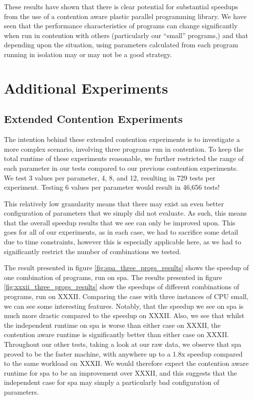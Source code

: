 These results have shown that there is clear potential for substantial speedups from the use of a contention aware plastic parallel programming library. We have seen that the performance characteristics of programs can change significantly when run in contention with others (particularly our ``small'' programs,) and that depending upon the situation, using parameters calculated from each program running in isolation may or may not be a good strategy.



\section{Additional Experiments}
\label{section:results:additional_experiments}

\subsection{Extended Contention Experiments}
\label{section:results:extended_contention_experiments}

The intention behind these extended contention experiments is to investigate a more complex scenario, involving three programs run in contention. To keep the total runtime of these experiments reasonable, we further restricted the range of each parameter in our tests compared to our previous contention experiments. We test 3 values per parameter, 4, 8, and 12, resulting in 729 tests per experiment. Testing 6 values per parameter would result in 46,656 tests!

This relatively low granularity means that there may exist an even better configuration of parameters that we simply did not evaluate. As such, this means that the overall speedup results that we see can only be improved upon. This goes for all of our experiments, as in each case, we had to sacrifice some detail due to time constraints, however this is especially applicable here, as we had to significantly restrict the number of combinations we tested.

The result presented in figure \ref{fig:spa_three_progs_results} shows the speedup of one combination of programs, run on spa. The results presented in figure \ref{fig:xxxii_three_progs_results} show the speedups of different combinations of programs, run on XXXII. Comparing the case with three instances of CPU small, we can see some interesting features. Notably, that the speedup we see on spa is much more drastic compared to the speedup on XXXII. Also, we see that whilst the independent runtime on spa is worse than either case on XXXII, the contention aware runtime is significantly better than either case on XXXII. Throughout our other tests, taking a look at our raw data, we observe that spa proved to be the faster machine, with anywhere up to a 1.8x speedup compared to the same workload on XXXII. We would therefore expect the contention aware runtime for spa to be an improvement over XXXII, and this suggests that the independent case for spa may simply a particularly bad configuration of parameters.


